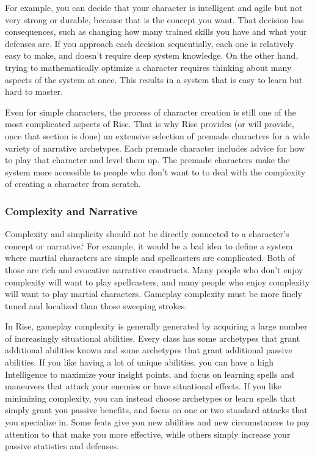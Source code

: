       For example, you can decide that your character is intelligent and agile but not very strong or durable, because that is the concept you want.
      That decision has consequences, such as changing how many trained skills you have and what your defenses are.
      If you approach each decision sequentially, each one is relatively easy to make, and doesn't require deep system knowledge.
      On the other hand, trying to mathematically optimize a character requires thinking about many aspects of the system at once.
      This results in a system that is easy to learn but hard to master.

      Even for simple characters, the process of character creation is still one of the most complicated aspects of Rise.
      That is why Rise provides (or will provide, once that section is done) an extensive selection of premade characters for a wide variety of narrative archetypes.
      Each premade character includes advice for how to play that character and level them up.
      The premade characters make the system more accessible to people who don't want to to deal with the complexity of creating a character from scratch.

    \subsubsection{Complexity and Narrative}
      Complexity and simplicity should not be directly connected to a character's concept or narrative.`
      For example, it would be a bad idea to define a system where martial characters are simple and spellcasters are complicated.
      Both of those are rich and evocative narrative constructs.
      Many people who don't enjoy complexity will want to play spellcasters, and many people who enjoy complexity will want to play martial characters.
      Gameplay complexity must be more finely tuned and localized than those sweeping strokes.

      In Rise, gameplay complexity is generally generated by acquiring a large number of increasingly situational abilities.
      Every class has some archetypes that grant additional abilities known and some archetypes that grant additional passive abilities.
      If you like having a lot of unique abilities, you can have a high Intelligence to maximize your insight points, and focus on learning spells and maneuvers that attack your enemies or have situational effects.
      If you like minimizing complexity, you can instead choose archetypes or learn spells that simply grant you passive benefits, and focus on one or two standard attacks that you specialize in.
      Some feats give you new abilities and new circumstances to pay attention to that make you more effective, while others simply increase your passive statistics and defenses.

